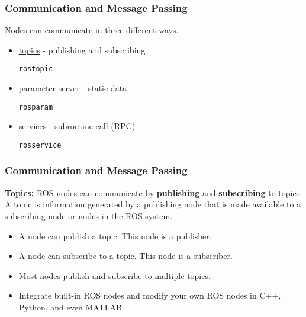 \documentclass[fleqn]{beamer} %
\newcommand{\sectiontitleII}{Communication and Message Passing}
\begin{document}
	\begin{frame}[label=sectionII,containsverbatim] \small
		\frametitle{\sectiontitleII}
		
                  {\large  Nodes can communicate in three different ways. }
                        \begin{itemize}
                            \item \href{http://wiki.ros.org/Topics}{\underline{topics}} - publishing and subscribing 
                            \begin{verbatim}
rostopic                             
                            \end{verbatim}
                            \item \href{http://wiki.ros.org/Parameter\%20Serverparameters}{\underline{parameter server}} - static data 
                            \begin{verbatim}
rosparam                        
                            \end{verbatim}
                            \item \href{http://wiki.ros.org/Services}{\underline{services}} - subroutine call (RPC) \begin{verbatim}
rosservice                      
                            \end{verbatim}
                        \end{itemize}    


	\end{frame}

	\begin{frame}[containsverbatim] \small
		\frametitle{\sectiontitleII}

\href{http://wiki.ros.org/Topics}{\bf Topics:} ROS nodes can communicate by {\bf publishing} and {\bf subscribing} to topics. A topic is information generated by a publishing node that is made available to a subscribing node or nodes in the ROS system.
        
        \begin{itemize}		
            \item A node can publish a topic. This node is a publisher.    	
            \item A node can subscribe to a topic. This node is a subscriber.
            \item Most nodes publish and subscribe to multiple topics. 
            \item Integrate built-in ROS nodes and modify your own ROS nodes in C++, Python, and even MATLAB
            
        \end{itemize}
        
	\end{frame}
\end{document}

